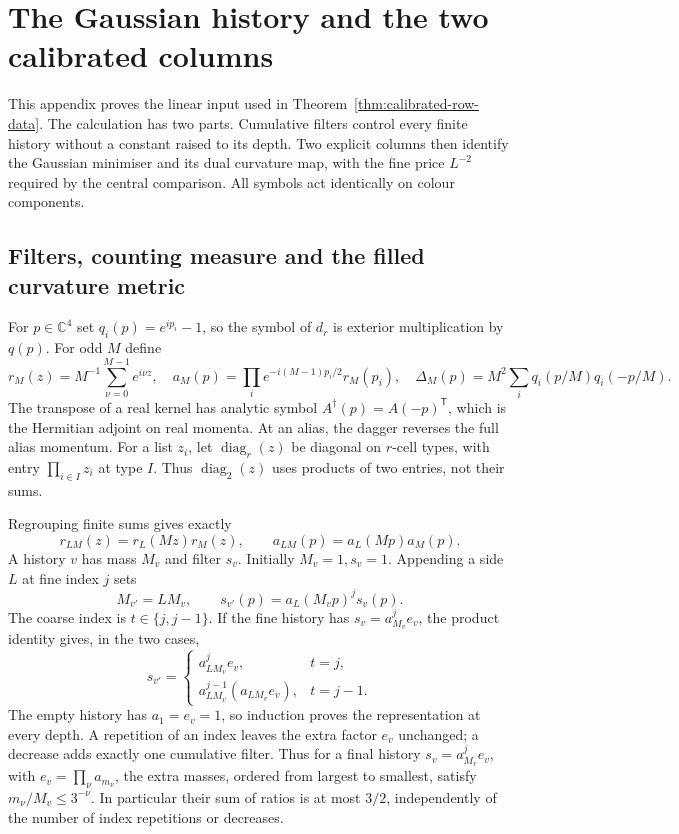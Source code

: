 \documentclass[11pt,reqno]{amsart}
\numberwithin{equation}{section}
\theoremstyle{definition}
\theoremstyle{remark}
\newcommand{\C}{\mathbb C}
\begin{document}
\section{The Gaussian history and the two calibrated columns}
\label{app:calibration}

This appendix proves the linear input used in
Theorem~\ref{thm:calibrated-row-data}. The calculation has two
parts. Cumulative filters control every finite history without a
constant raised to its depth. Two explicit columns then identify
the Gaussian minimiser and its dual curvature map, with the
fine price \(L^{-2}\) required by the central comparison.
All symbols act identically on colour components.

\subsection{Filters, counting measure and the filled curvature metric}

For \(p\in\C^4\) set \(q_i(p)=e^{ip_i}-1\), so the symbol of
\(d_r\) is exterior multiplication by \(q(p)\). For odd \(M\)
define
\[
 r_M(z)=M^{-1}\sum_{\nu=0}^{M-1}e^{i\nu z},\quad
 a_M(p)=\prod_i e^{-i(M-1)p_i/2}r_M(p_i),\quad
 \Delta_M(p)=M^2\sum_iq_i(p/M)q_i(-p/M).
\]
The transpose of a real kernel has analytic symbol
\(A^\dagger(p)=A(-p)^{\mathsf T}\), which is the Hermitian adjoint on
real momenta. At an alias, the dagger reverses the full alias
momentum. For a list \(z_i\), let \(\operatorname{diag}_r(z)\)
be diagonal on \(r\)-cell types, with entry \(\prod_{i\in I}z_i\)
at type \(I\). Thus \(\operatorname{diag}_2(z)\) uses products
of two entries, not their sums.

Regrouping finite sums gives exactly
\[
 r_{LM}(z)=r_L(Mz)r_M(z),\qquad
                         a_{LM}(p)=a_L(Mp)a_M(p).
\]
A history \(v\) has mass \(M_v\) and filter \(s_v\). Initially
\(M_v=1,s_v=1\). Appending a side \(L\) at fine index \(j\)
sets
\begin{equation}
 M_{v'}=LM_v,\qquad s_{v'}(p)=a_L(M_vp)^js_v(p).
 \label{eq:calibration-filter-history}
\end{equation}
The coarse index is \(t\in\{j,j-1\}\). If the fine history
has \(s_v=a_{M_v}^j e_v\), the product identity gives, in
the two cases,
\begin{equation}
 s_{v'}=
 \begin{cases}
  a_{LM_v}^{j}e_v,&t=j,\\
  a_{LM_v}^{j-1}(a_{LM_v}e_v),&t=j-1.
 \end{cases}
 \label{eq:calibration-drop-factorisation}
\end{equation}
The empty history has \(a_1=e_v=1\), so induction proves
the representation at every depth. A repetition of an
index leaves the extra factor \(e_v\) unchanged; a decrease
adds exactly one cumulative filter. Thus for a final history
\(s_v=a_{M_v}^j e_v\), with
\(e_v=\prod_\nu a_{m_\nu}\), the extra masses, ordered
from largest to smallest, satisfy
\(m_\nu/M_v\le3^{-\nu}\). In particular their sum of
ratios is at most \(3/2\), independently of the number
of index repetitions or decreases.
\end{document}

